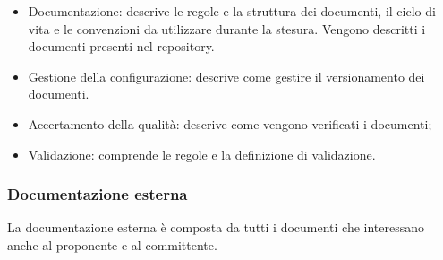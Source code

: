 \begin{itemize}
\begin{itemize}
\begin{itemize}
                \item Documentazione: descrive le regole e la struttura dei documenti, il ciclo di vita e le convenzioni da utilizzare durante la stesura. Vengono descritti i documenti presenti nel repository.
                \item Gestione della configurazione: descrive come gestire il versionamento dei documenti.
                \item Accertamento della qualità: descrive come vengono verificati i documenti;
                \item Validazione: comprende le regole e la definizione di validazione.
            \end{itemize} 
        \end{itemize}
        \end{itemize}
        \subsubsection{Documentazione esterna}
        La documentazione esterna è composta da tutti i documenti che interessano anche al proponente e al committente.
